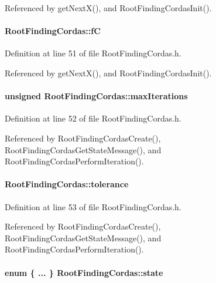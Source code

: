 Referenced by getNextX(), and RootFindingCordasInit().\hypertarget{structRootFindingCordas_36d104146b164a3da07f9d3f60a04506}{
\paragraph[fC]{ {\bf RootFindingCordas::fC}}\hfill}
\label{structRootFindingCordas_36d104146b164a3da07f9d3f60a04506}




Definition at line 51 of file RootFindingCordas.h.

Referenced by getNextX(), and RootFindingCordasInit().\hypertarget{structRootFindingCordas_1823f4e1787202f918fdd00f95792d1f}{
\paragraph[maxIterations]{\setlength{\rightskip}{0pt plus 5cm}unsigned {\bf RootFindingCordas::maxIterations}}\hfill}
\label{structRootFindingCordas_1823f4e1787202f918fdd00f95792d1f}




Definition at line 52 of file RootFindingCordas.h.

Referenced by RootFindingCordasCreate(), RootFindingCordasGetStateMessage(), and RootFindingCordasPerformIteration().\hypertarget{structRootFindingCordas_692d6a123f5a6e5d42081bee02560f45}{
\paragraph[tolerance]{ {\bf RootFindingCordas::tolerance}}\hfill}
\label{structRootFindingCordas_692d6a123f5a6e5d42081bee02560f45}




Definition at line 53 of file RootFindingCordas.h.

Referenced by RootFindingCordasCreate(), RootFindingCordasGetStateMessage(), and RootFindingCordasPerformIteration().\hypertarget{structRootFindingCordas_1cf4fb48b5b925ba6ff392679e98ffec}{
\paragraph[state]{\setlength{\rightskip}{0pt plus 5cm}enum \{ ... \}   {\bf RootFindingCordas::state}}\hfill}
\label{structRootFindingCordas_1cf4fb48b5b925ba6ff392679e98ffec}


